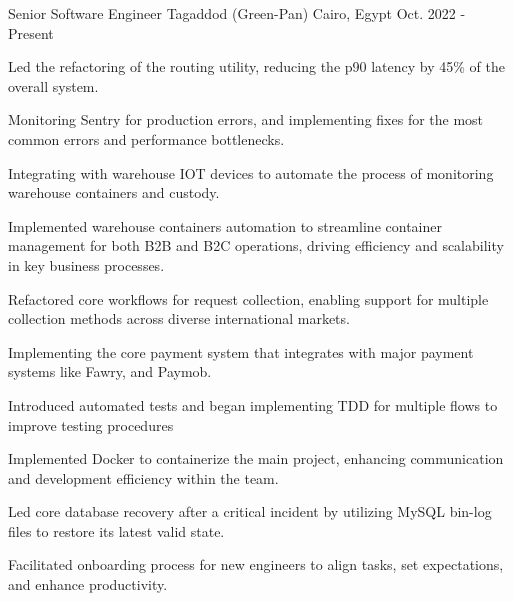 

\begin{cventries}

  \cventry
    {Senior Software Engineer} %
    {Tagaddod (Green-Pan)} %
    {Cairo, Egypt} %
    {Oct. 2022 - Present} %
    {
      \begin{cvitems} %
        \item {Led the refactoring of the routing utility, reducing the p90 latency by 45\% of the overall system.}
        \item {Monitoring Sentry for production errors, and implementing fixes for the most common errors and performance bottlenecks.}
        \item {Integrating with warehouse IOT devices to automate the process of monitoring warehouse containers and custody.}
        \item {Implemented warehouse containers automation to streamline container management for both B2B and B2C operations, driving efficiency and scalability in key business processes.}
        \item {Refactored core workflows for request collection, enabling support for multiple collection methods across diverse international markets.}
        \item {Implementing the core payment system that integrates with major payment systems like Fawry, and Paymob.}
        \item {Introduced automated tests and began implementing TDD for multiple flows to improve testing procedures}
        \item {Implemented Docker to containerize the main project, enhancing communication and development efficiency within the team.}
        \item {Led core database recovery after a critical incident by utilizing MySQL bin-log files to restore its latest valid state.
              }
        \item {Facilitated onboarding process for new engineers to align tasks, set expectations, and enhance productivity.}
      \end{cvitems}
    }


\end{cventries}
